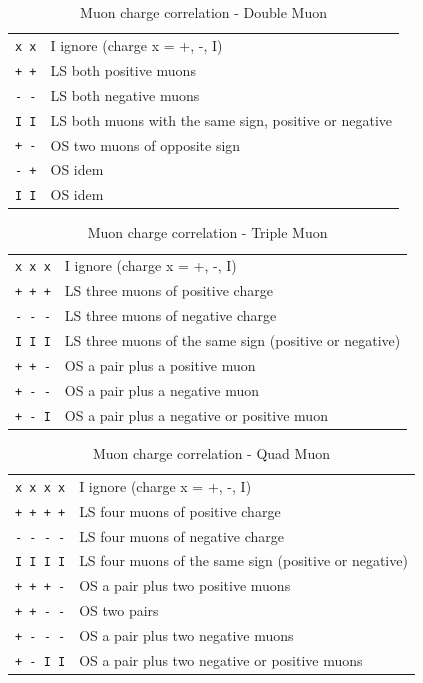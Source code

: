 \begin{table}[ht]
\caption{Muon charge correlation - Double Muon}
\vspace{5mm}
\centering
\begin{tabular}{|c|l|}\hline
\verb|x x| & I ignore (charge x = +, -, I) \\
\verb|+ +| & LS both positive muons \\
\verb|- -| & LS both negative muons \\
\verb|I I| & LS both muons with the same sign, positive or negative \\
\verb|+ -| & OS two muons of opposite sign \\
\verb|- +| & OS idem \\
\verb|I I| & OS idem \\\hline
\end{tabular}
\label{tab:gtl:muon_charge_corr_double}
\end{table}

\begin{table}[ht]
\caption{Muon charge correlation - Triple Muon}
\vspace{5mm}
\centering
\begin{tabular}{|c|l|}\hline
\verb|x x x| & I  ignore (charge x = +, -, I) \\
\verb|+ + +| & LS three muons of positive charge \\
\verb|- - -| & LS three muons of negative charge \\
\verb|I I I| & LS three muons of the same sign (positive or negative) \\
\verb|+ + -| & OS a pair plus a positive muon \\
\verb|+ - -| & OS a pair plus a negative muon \\
\verb|+ - I| & OS a pair plus a negative or positive muon \\\hline
\end{tabular}
\label{tab:gtl:muon_charge_corr_triple}
\end{table}

\begin{table}[ht]
\caption{Muon charge correlation - Quad Muon}
\vspace{5mm}
\centering
\begin{tabular}{|c|l|}\hline
\verb|x x x x| & I  ignore (charge x = +, -, I) \\
\verb|+ + + +| & LS four muons of positive charge \\
\verb|- - - -| & LS four muons of negative charge \\
\verb|I I I I| & LS four muons of the same sign (positive or negative) \\
\verb|+ + + -| & OS a pair plus two positive muons \\
\verb|+ + - -| & OS two pairs \\
\verb|+ - - -| & OS a pair plus two negative muons \\
\verb|+ - I I| & OS a pair plus two negative or positive muons \\\hline
\end{tabular}
\label{tab:gtl:muon_charge_corr_quad}
\end{table}

